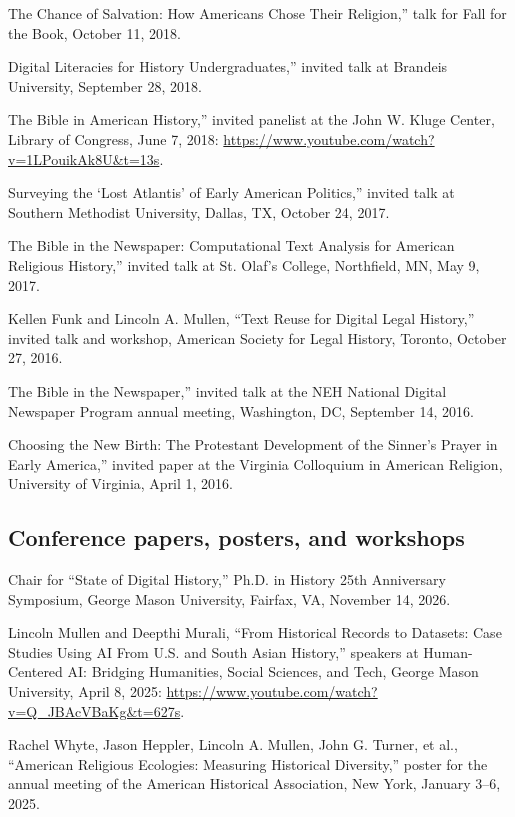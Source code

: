 \documentclass[11pt]{article}
\begin{document}
\noindent{}The Chance of Salvation: How Americans Chose Their Religion,'' talk for Fall for the Book, October 11, 2018.

\noindent{}Digital Literacies for History Undergraduates,'' invited talk at Brandeis University, September 28, 2018.

\noindent{}The Bible in American History,'' invited panelist at the John W. Kluge Center, Library of Congress, June 7, 2018: \url{https://www.youtube.com/watch?v=1LPouikAk8U&t=13s}.

\noindent{}Surveying the `Lost Atlantis' of Early American Politics,'' invited talk at Southern Methodist University, Dallas, TX, October 24, 2017.

\noindent{}The Bible in the Newspaper: Computational Text Analysis for American Religious History,'' invited talk at St. Olaf's College, Northfield, MN, May 9, 2017.

Kellen Funk and Lincoln A. Mullen, ``Text Reuse for Digital Legal History,'' invited talk and workshop, American Society for Legal History, Toronto, October 27, 2016.

\noindent{}The Bible in the Newspaper,'' invited talk at the NEH National Digital Newspaper Program annual meeting, Washington, DC, September 14, 2016.

\noindent{}Choosing the New Birth: The Protestant Development of the Sinner's Prayer in Early America,'' invited paper at the Virginia Colloquium in American Religion, University of Virginia, April 1, 2016.

\subsection{Conference papers, posters, and workshops}\label{Conference papers}

Chair for ``State of Digital History,'' Ph.D. in History 25th Anniversary
Symposium, George Mason University, Fairfax, VA, November 14, 2026.

Lincoln Mullen and Deepthi Murali, ``From Historical Records to Datasets: Case
Studies Using AI From U.S. and South Asian History,'' speakers at Human-Centered
AI: Bridging Humanities, Social Sciences, and Tech, George Mason University,
April 8, 2025: \url{https://www.youtube.com/watch?v=Q_JBAcVBaKg&t=627s}.

Rachel Whyte, Jason Heppler, Lincoln A. Mullen, John G. Turner, et al., ``American Religious Ecologies: Measuring Historical Diversity,'' poster for the annual meeting of the American Historical Association, New York, January 3--6, 2025.
\end{document}

